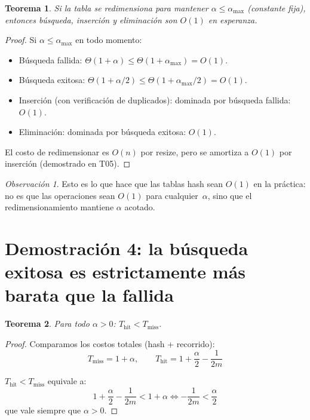 \documentclass[11pt, letterpaper]{article}
\theoremstyle{definition}
\theoremstyle{plain}
\newtheorem{theorem}{Teorema}[section]
\theoremstyle{remark}
\newtheorem{remark}{Observación}[section]
\begin{document}
\begin{theorem}\label{thm:constant}
Si la tabla se redimensiona para mantener
$\alpha \leq \alpha_{\max}$ (constante fija), entonces búsqueda,
inserción y eliminación son $O(1)$ en esperanza.
\end{theorem}

\begin{proof}
Si $\alpha \leq \alpha_{\max}$ en todo momento:
\begin{itemize}
  \item Búsqueda fallida:
    $\Theta(1 + \alpha) \leq \Theta(1 + \alpha_{\max}) = O(1)$.
  \item Búsqueda exitosa:
    $\Theta(1 + \alpha/2) \leq \Theta(1 + \alpha_{\max}/2) = O(1)$.
  \item Inserción (con verificación de duplicados): dominada por
    búsqueda fallida: $O(1)$.
  \item Eliminación: dominada por búsqueda exitosa: $O(1)$.
\end{itemize}
El costo de redimensionar es $O(n)$ por resize, pero se amortiza a
$O(1)$ por inserción (demostrado en T05).
\end{proof}

\begin{remark}
Esto es lo que hace que las tablas hash sean $O(1)$ en la práctica:
no es que las operaciones sean $O(1)$ para cualquier~$\alpha$, sino
que el redimensionamiento mantiene $\alpha$ acotado.
\end{remark}

\section{Demostración 4: la búsqueda exitosa es estrictamente más
  barata que la fallida}

\begin{theorem}\label{thm:hit-cheaper}
Para todo $\alpha > 0$:
$T_{\text{hit}} < T_{\text{miss}}$.
\end{theorem}

\begin{proof}
Comparamos los costos totales (hash + recorrido):
\[
  T_{\text{miss}} = 1 + \alpha, \qquad
  T_{\text{hit}} = 1 + \frac{\alpha}{2} - \frac{1}{2m}
\]

$T_{\text{hit}} < T_{\text{miss}}$ equivale a:
\[
  1 + \frac{\alpha}{2} - \frac{1}{2m} < 1 + \alpha
  \iff -\frac{1}{2m} < \frac{\alpha}{2}
\]
que vale siempre que $\alpha > 0$. \checkmark
\end{proof}
\end{document}
